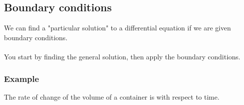 \documentclass{article}[18pt]
\begin{document}
\subsection{Boundary conditions}
We can find a "particular solution" to a differential equation if we are given boundary conditions.\\
\\
You start by finding the general solution, then apply the boundary conditions.
\subsubsection{Example}
The rate of change of the volume of a container is with respect to time.
\end{document}
